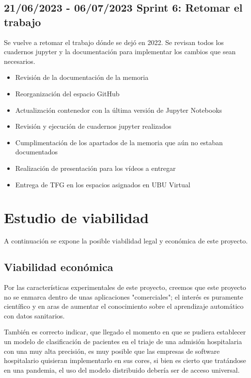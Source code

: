 \subsection{21/06/2023 - 06/07/2023 \newline Sprint 6: Retomar el trabajo}

Se vuelve a retomar el trabajo dónde se dejó en 2022. Se revisan todos los cuadernos jupyter y la documentación para implementar los cambios que sean necesarios.

\begin{itemize}
    \item Revisión de la documentación de la memoria
    \item Reorganización del espacio GitHub
    \item Actualización contenedor con la última versión de Jupyter Notebooks
    \item Revisión y ejecución de cuadernos jupyter realizados
    \item Cumplimentación de los apartados de la memoria que aún no estaban documentados
    \item Realización de presentación para los vídeos a entregar
    \item Entrega de TFG en los espacios asignados en UBU Virtual
\end{itemize}


\section{Estudio de viabilidad}

A continuación se expone la posible viabilidad legal y económica de este proyecto.

\subsection{Viabilidad económica}

Por las características experimentales de este proyecto, creemos que este proyecto no se enmarca dentro de unas aplicaciones "comerciales"; el interés es puramente científico y en aras de aumentar el conocimiento sobre el aprendizaje automático con datos sanitarios.

También es correcto indicar, que llegado el momento en que se pudiera establecer un modelo de clasificación de pacientes en el triaje de una admisión hospitalaria con una muy alta precisión, es muy posible que las empresas de software hospitalario quisieran implementarlo en sus cores, si bien es cierto que tratándose en una pandemia, el uso del modelo distribuido debería ser de acceso universal.

